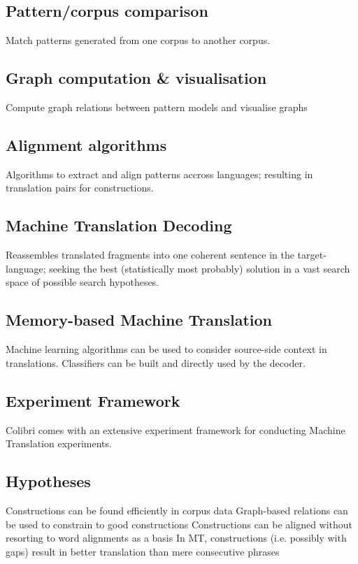 \documentclass[12pt]{article}
\begin{document}
\subsection{Pattern/corpus comparison} Match patterns generated from one corpus to another corpus.
\subsection{Graph computation \& visualisation} Compute graph relations between pattern models and visualise graphs
\subsection{Alignment algorithms} Algorithms to extract and align patterns accross languages; resulting in translation pairs for constructions.
\subsection{Machine Translation Decoding} Reassembles translated fragments into one coherent sentence in the target-language; seeking the best (statistically most probably) solution in a vast search space of possible search hypotheses.
\subsection{Memory-based Machine Translation} Machine learning algorithms can be used to consider source-side context in translations. Classifiers can be built and directly used by the decoder.
\subsection{Experiment Framework} Colibri comes with an extensive experiment framework for conducting Machine Translation experiments.\

\subsection{Hypotheses} %

Constructions can be found efficiently in corpus data
Graph-based relations can be used to constrain to good constructions
Constructions can be aligned without resorting to word alignments as a basis
In MT, constructions (i.e. possibly with gaps) result in better translation than mere consecutive phrases
\end{document}
